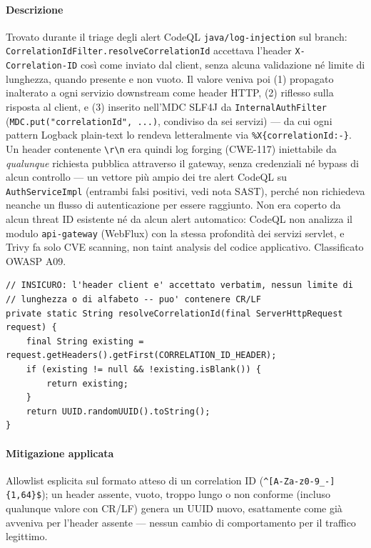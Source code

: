 ﻿\documentclass[a4paper,12pt]{report}
\begin{document}
\paragraph{Descrizione}
Trovato durante il triage degli alert CodeQL \texttt{java/log-injection} sul
branch: \texttt{CorrelationIdFilter.resolveCorrelationId} accettava l'header
\texttt{X-Correlation-ID} così come inviato dal client, senza alcuna
validazione né limite di lunghezza, quando presente e non vuoto. Il valore
veniva poi (1) propagato inalterato a ogni servizio downstream come header
HTTP, (2) riflesso sulla risposta al client, e (3) inserito nell'MDC SLF4J
da \texttt{InternalAuthFilter} (\texttt{MDC.put("correlationId", ...)},
condiviso da sei servizi) --- da cui ogni pattern Logback plain-text lo
rendeva letteralmente via \texttt{\%X\{correlationId:-\}}. Un header
contenente \texttt{\textbackslash r\textbackslash n} era quindi log
forging (CWE-117) iniettabile da \emph{qualunque} richiesta pubblica
attraverso il gateway, senza credenziali né bypass di alcun controllo ---
un vettore più ampio dei tre alert CodeQL su \texttt{AuthServiceImpl}
(entrambi falsi positivi, vedi nota SAST), perché non richiedeva neanche
un flusso di autenticazione per essere raggiunto. Non era coperto da alcun
threat ID esistente né da alcun alert automatico: CodeQL non analizza il
modulo \texttt{api-gateway} (WebFlux) con la stessa profondità dei servizi
servlet, e Trivy fa solo CVE scanning, non taint analysis del codice
applicativo. Classificato OWASP A09.

\begin{insecurebox}[title={Codice Vulnerabile --- CorrelationIdFilter.java (baseline)}]
\begin{lstlisting}[style=java]
// INSICURO: l'header client e' accettato verbatim, nessun limite di
// lunghezza o di alfabeto -- puo' contenere CR/LF
private static String resolveCorrelationId(final ServerHttpRequest request) {
    final String existing = request.getHeaders().getFirst(CORRELATION_ID_HEADER);
    if (existing != null && !existing.isBlank()) {
        return existing;
    }
    return UUID.randomUUID().toString();
}
\end{lstlisting}
\end{insecurebox}

\paragraph{Mitigazione applicata}
Allowlist esplicita sul formato atteso di un correlation ID
(\texttt{\^{}[A-Za-z0-9\_-]\{1,64\}\$}); un header assente, vuoto, troppo
lungo o non conforme (incluso qualunque valore con CR/LF) genera un UUID
nuovo, esattamente come già avveniva per l'header assente --- nessun
cambio di comportamento per il traffico legittimo.
\end{document}
